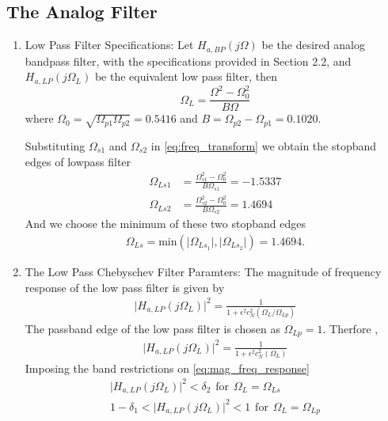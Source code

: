 \documentclass{article}
\begin{document}
\subsection{The Analog Filter}
\begin{enumerate}
\item {Low Pass Filter Specifications:}  Let $H_{a, BP}(j\Omega)$ be the desired analog bandpass filter,  with the specifications provided in Section 2.2, and $H_{a,LP}(j\Omega_L)$ be the equivalent low pass filter, then
\begin{equation}
\Omega_L = \frac{\Omega^2 - \Omega_0^2}{B\Omega} \label{eq:freq_transform}
\end{equation}
where $\Omega_0 = \sqrt{\Omega_{p1}\Omega_{p2}} = 0.5416$ and $B = \Omega_{p2} - \Omega_{p1} = 0.1020$.

Substituting $\Omega_{s1}$ and $\Omega_{s2}$ in \eqref{eq:freq_transform} we obtain the stopband edges of lowpass filter 
\begin{align}
    \Omega_{Ls1} &= \frac{\Omega_{s1}^2 - \Omega_0^2}{B\Omega_{s1}} = -1.5337\\
    \Omega_{Ls2} &= \frac{\Omega_{s2}^2 - \Omega_0^2}{B\Omega_{s2}} = 1.4694
\end{align}
And we choose the minimum of these two stopband edges
\begin{align}
    \Omega_{Ls} = \mbox{min}(\vert \Omega_{Ls_1}\vert,\vert \Omega_{Ls_2}\vert) = 1.4694.
\end{align}
\item {The Low Pass Chebyschev Filter Paramters:} The magnitude of frequency response of the low pass filter is given by 
\begin{align}
    \vert H_{a,LP}(j\Omega_L)\vert^2 = \frac{1}{1 + \epsilon^2c_N^2(\Omega_L/\Omega_{Lp})} \label{eq:mag_freq_response}
\end{align}
The passband edge of the low pass filter is chosen as $\Omega_{Lp}=1$.
Therfore ,
\begin{align}
    \vert H_{a,LP}(j\Omega_L)\vert^2 = \frac{1}{1 + \epsilon^2c_N^2(\Omega_L)} \label{eq:specification}
\end{align}
Imposing the band restrictions on \eqref{eq:mag_freq_response} \\
\begin{align}
    \vert H_{a,LP}(j\Omega_L)\vert^2 < \delta_{2} \hspace{5pt} \text{for}\hspace{5pt} \Omega_L = \Omega_{Ls}\\
    1-\delta_{1}<\vert H_{a,LP}(j\Omega_L)\vert^2 < 1 \hspace{5pt} \text{for}\hspace{5pt} \Omega_L = \Omega_{Lp}\\

\end{align}
\end{enumerate}
\end{document}
